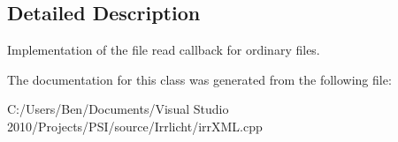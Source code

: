 \subsection{Detailed Description}
Implementation of the file read callback for ordinary files. 

The documentation for this class was generated from the following file\-:\begin{DoxyCompactItemize}
\item 
C\-:/\-Users/\-Ben/\-Documents/\-Visual Studio 2010/\-Projects/\-P\-S\-I/source/\-Irrlicht/irr\-X\-M\-L.\-cpp\end{DoxyCompactItemize}
